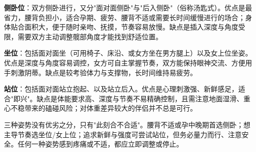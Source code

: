 \noindent\textbf{侧卧位}：双方侧卧进行，又分"面对面侧卧"与"后入侧卧"（俗称汤匙式）。优点是最省力，腰背负担小，适合孕期、疲劳、腰背不适或需要长时间缓慢进行的场合；身体贴合面积大，便于随时亲吻、抚摸，节奏容易放慢。缺点是插入深度与角度受限，需要双方主动调整髋部角度才能找到舒适位置。

\noindent\textbf{坐位}：包括面对面坐（可用椅子、床沿、或女方坐在男方腿上）以及女上位坐姿。优点是深度与角度容易调控，女方可自主掌握节奏，双方能保持眼神交流、方便用手刺激阴蒂。缺点是较考验体力与支撑物，长时间维持易疲劳。

\noindent\textbf{站位}：包括面对面站立抱起、以及站立后入。优点是心理刺激强、新鲜感足，适合"即兴"。缺点是体能要求高、深度与节奏不易精确控制，且需注意地面湿滑、重心不稳带来的磕碰风险；对体重差异较大的伴侣并不总是可行。

\begin{tcolorbox}[colback=pink!5!white,colframe=red!50!black,title=贴心小叮咛]
三种姿势没有优劣之分，只有"此刻合不合适"。腰背不适或孕中晚期首选侧卧；想主导节奏选坐位/女上位；追求新鲜与强度可尝试站位，但务必量力而行、注意安全。任何一种姿势感到疼痛或不适，都应立即调整或停止。
\end{tcolorbox}
